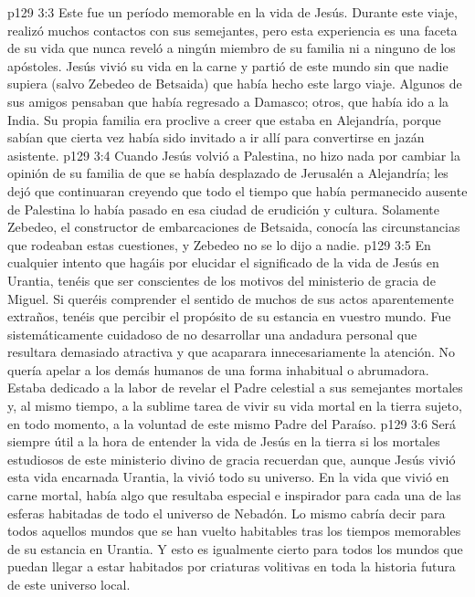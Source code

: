 \vs p129 3:3 Este fue un período memorable en la vida de Jesús. Durante este viaje, realizó muchos contactos con sus semejantes, pero esta experiencia es una faceta de su vida que nunca reveló a ningún miembro de su familia ni a ninguno de los apóstoles. Jesús vivió su vida en la carne y partió de este mundo sin que nadie supiera (salvo Zebedeo de Betsaida) que había hecho este largo viaje. Algunos de sus amigos pensaban que había regresado a Damasco; otros, que había ido a la India. Su propia familia era proclive a creer que estaba en Alejandría, porque sabían que cierta vez había sido invitado a ir allí para convertirse en jazán asistente.
\vs p129 3:4 Cuando Jesús volvió a Palestina, no hizo nada por cambiar la opinión de su familia de que se había desplazado de Jerusalén a Alejandría; les dejó que continuaran creyendo que todo el tiempo que había permanecido ausente de Palestina lo había pasado en esa ciudad de erudición y cultura. Solamente Zebedeo, el constructor de embarcaciones de Betsaida, conocía las circunstancias que rodeaban estas cuestiones, y Zebedeo no se lo dijo a nadie.
\vs p129 3:5 \pc En cualquier intento que hagáis por elucidar el significado de la vida de Jesús en Urantia, tenéis que ser conscientes de los motivos del ministerio de gracia de Miguel. Si queréis comprender el sentido de muchos de sus actos aparentemente extraños, tenéis que percibir el propósito de su estancia en vuestro mundo. Fue sistemáticamente cuidadoso de no desarrollar una andadura personal que resultara demasiado atractiva y que acaparara innecesariamente la atención. No quería apelar a los demás humanos de una forma inhabitual o abrumadora. Estaba dedicado a la labor de revelar el Padre celestial a sus semejantes mortales y, al mismo tiempo, a la sublime tarea de vivir su vida mortal en la tierra sujeto, en todo momento, a la voluntad de este mismo Padre del Paraíso.
\vs p129 3:6 \pc Será siempre útil a la hora de entender la vida de Jesús en la tierra si los mortales estudiosos de este ministerio divino de gracia recuerdan que, aunque Jesús vivió esta vida encarnada  Urantia, la vivió  todo su universo. En la vida que vivió en carne mortal, había algo que resultaba especial e inspirador para cada una de las esferas habitadas de todo el universo de Nebadón. Lo mismo cabría decir para todos aquellos mundos que se han vuelto habitables tras los tiempos memorables de su estancia en Urantia. Y esto es igualmente cierto para todos los mundos que puedan llegar a estar habitados por criaturas volitivas en toda la historia futura de este universo local.
